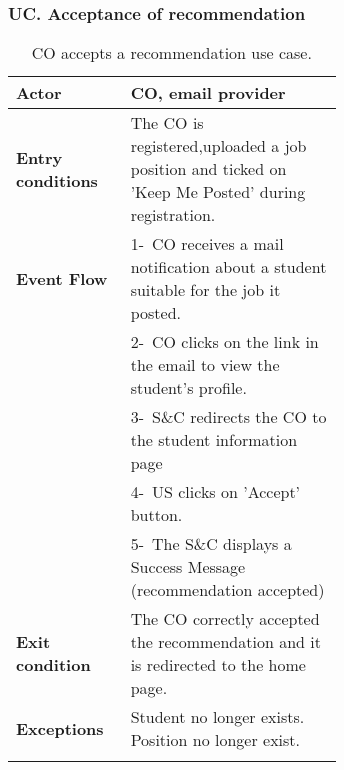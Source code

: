 \subsubsection*{UC\cuc . Acceptance of recommendation}
\begin{center}
    \begin{longtable}{|l|p{0.65\linewidth}|}
        \hline
        \textbf{Actor}            & CO, email provider \\
        \hline
        \textbf{Entry conditions} & The CO is registered,uploaded a job position and ticked on 'Keep Me Posted' during registration. \\
        \hline
        \textbf{Event Flow}       & 1-\  CO receives a mail notification about a student suitable for the job it posted. \\
        & 2-\ CO clicks on the link in the email to view the student's profile. \\
        & 3-\ S\&C redirects the CO to the student information page\\
        & 4-\ US clicks on 'Accept' button.\\
        & 5-\ The S\&C displays a Success Message (recommendation accepted)\\
        \hline
        \textbf{Exit condition}   &  The CO correctly accepted the recommendation and it is redirected to the home page. \\
        \hline
        \textbf{Exceptions}       & Student no longer exists. Position no longer exist. \\
        \hline
        \caption{CO accepts a recommendation use case.}
        \label{tab: us_recommendation_use_case}
    \end{longtable}
\end{center}

